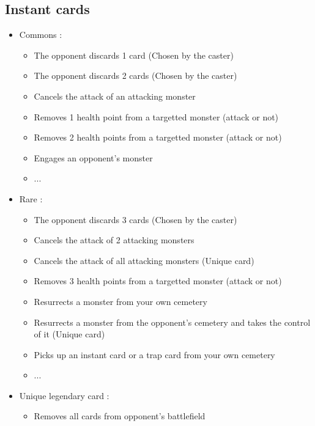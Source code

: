 \documentclass[a4paper,12pt]{book}
\begin{document}
\subsection{Instant cards}
\begin{itemize}
	\item Commons :
	\begin{itemize}
		\item The opponent discards 1 card (Chosen by the caster)
		\item The opponent discards 2 cards (Chosen by the caster)
		\item Cancels the attack of an attacking monster
		\item Removes 1 health point from a targetted monster (attack or not)
		\item Removes 2 health points from a targetted monster (attack or not)
		\item Engages an opponent's monster
		\item ...
	\end{itemize}
	\item Rare :
	\begin{itemize}
		\item The opponent discards 3 cards (Chosen by the caster)
		\item Cancels the attack of 2 attacking monsters
		\item Cancels the attack of all attacking monsters (Unique card)
		\item Removes 3 health points from a targetted monster (attack or not)
		\item Resurrects a monster from your own cemetery
		\item Resurrects a monster from the opponent's cemetery and takes the control of it (Unique card)
		\item Picks up an instant card or a trap card from your own cemetery
		\item ...
	\end{itemize}
	\item Unique legendary card :
	\begin{itemize}
		\item Removes all cards from opponent's battlefield
	\end{itemize}
\end{itemize}
\newpage
\end{document}
